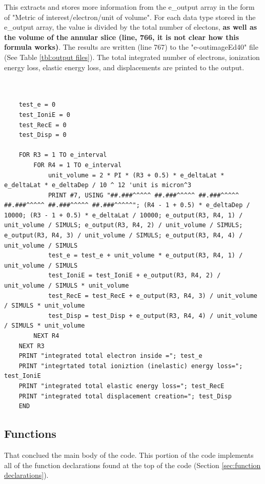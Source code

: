 \documentclass[10pt, reqno]{exam}
\begin{document}
This extracts and stores more information from the e\_output array in the form of "Metric of interest/electron/unit of volume". For each data type stored in the e\_output array, the value is divided by the total number of electons, \textbf{as well as the volume of the annular slice (line, 766, it is not clear how this formula works)}. The results are written (line 767) to the "e-outimageEd40" file (See Table \ref{tbl:output files}). The total integrated number of electrons, ionization energy loss, elastic energy loss, and displacements are printed to the output.

\begin{verbatim}
    
    
    test_e = 0
    test_IoniE = 0
    test_RecE = 0
    test_Disp = 0
    
    FOR R3 = 1 TO e_interval
        FOR R4 = 1 TO e_interval
            unit_volume = 2 * PI * (R3 + 0.5) * e_deltaLat * e_deltaLat * e_deltaDep / 10 ^ 12 'unit is micron^3
            PRINT #7, USING "##.###^^^^^ ##.###^^^^^ ##.###^^^^^ ##.###^^^^^ ##.###^^^^^ ##.###^^^^^"; (R4 - 1 + 0.5) * e_deltaDep / 10000; (R3 - 1 + 0.5) * e_deltaLat / 10000; e_output(R3, R4, 1) / unit_volume / SIMULS; e_output(R3, R4, 2) / unit_volume / SIMULS; e_output(R3, R4, 3) / unit_volume / SIMULS; e_output(R3, R4, 4) / unit_volume / SIMULS
            test_e = test_e + unit_volume * e_output(R3, R4, 1) / unit_volume / SIMULS
            test_IoniE = test_IoniE + e_output(R3, R4, 2) / unit_volume / SIMULS * unit_volume
            test_RecE = test_RecE + e_output(R3, R4, 3) / unit_volume / SIMULS * unit_volume
            test_Disp = test_Disp + e_output(R3, R4, 4) / unit_volume / SIMULS * unit_volume
        NEXT R4
    NEXT R3
    PRINT "integrated total electron inside ="; test_e
    PRINT "integrtated total ioniztion (inelastic) energy loss="; test_IoniE
    PRINT "integrated total elastic energy loss="; test_RecE
    PRINT "integrated total displacement creation="; test_Disp
    END
\end{verbatim}

\subsection{Functions}

That conclued the main body of the code. This portion of the code implements all of the function declarations found at the top of the code (Section \ref{sec:function declarations}). \par
\end{document}
